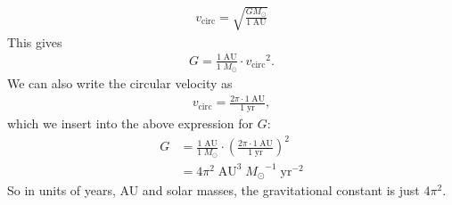 \documentclass{article}
\newcommand{\lrp}[1]{\left(#1\right)}
\begin{document}
\begin{align*}
    v_\text{circ} = \sqrt{\frac{GM_\odot}{1\;\text{AU}}}
\end{align*}
This gives 
\begin{align*}
    G = \frac{1\;\text{AU}}{1\;M_\odot}\cdot{v_\text{circ}}^2.
\end{align*}
We can also write the circular velocity as
\begin{align*}
    v_\text{circ} = \frac{2\pi\cdot 1\;\text{AU}}{1\;\text{yr}},
\end{align*}
which we insert into the above expression for $G$:
\begin{align*}
    G &= \frac{1\;\text{AU}}{1\;M_\odot}\cdot\lrp{\frac{2\pi\cdot 1\;\text{AU}}{1\;\text{yr}}}^2 \\
    &= 4\pi^2\;\text{AU}^3\;{M_\odot}^{-1}\;\text{yr}^{-2}
\end{align*}
So in units of years, AU and solar masses, the gravitational constant is just $4\pi^2$.
\end{document}
